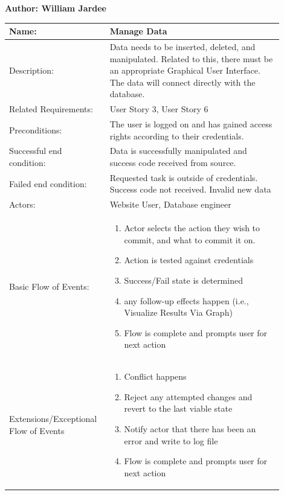 \documentclass[11pt]{article}
\begin{document}
\begin{table}[!ht]
\begin{center}
\textbf{Author: William Jardee}
\vspace*{1em}

\begin{tabular}{p{0.30\linewidth}p{0.60\linewidth}}
	Name: & Manage Data\\\hline
	Description: & Data needs to be inserted, deleted, and manipulated. Related to this, there must be an appropriate Graphical User Interface. The data will connect directly with the database.\\\hline
	Related Requirements:& User Story 3, User Story 6\\\hline
	Preconditions:& The user is logged on and has gained access rights according to their credentials.\\\hline
	Successful end condition:& Data is successfully manipulated and success code received from source. \\\hline
	Failed end condition:& Requested task is outside of credentials. Success code not received. Invalid new data\\\hline
	Actors:& Website User, Database engineer\\\hline
	Basic Flow of Events: & \begin{enumerate}
	\item Actor selects the action they wish to commit, and what to commit it on.
	\item Action is tested against credentials
	\item Success/Fail state is determined
	\item any follow-up effects happen (i.e., Visualize Results Via Graph)
	\item Flow is complete and prompts user for next action
	\end{enumerate}\\\hline
	Extensions/Exceptional Flow of Events & \begin{enumerate}
	\item Conflict happens
	\item Reject any attempted changes and revert to the last viable state
	\item Notify actor that there has been an error and write to log file
	\item Flow is complete and prompts user for next action
	\end{enumerate}
\end{tabular}
\label{des:man_dat}	
\end{center}
\end{table}
\end{document}
